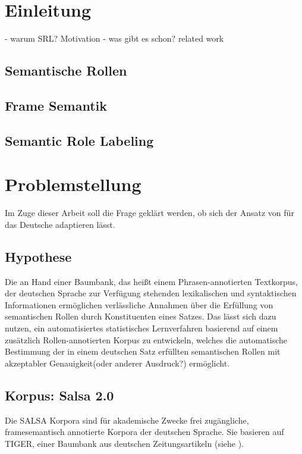 \documentclass[12pt]{article}
\begin{document}
\pagestyle{fancy} %
\fancyhf{} %
\renewcommand{\headrulewidth}{0pt} %
\renewcommand{\footrulewidth}{0pt} %
\fancyfoot[C]{\thepage} %


\newpage
{}

\section{Einleitung}
- warum SRL? Motivation
- was gibt es schon? related work
\subsection{Semantische Rollen}
\subsection{Frame Semantik}
\subsection{Semantic Role Labeling}
\section{Problemstellung}
Im Zuge dieser Arbeit soll die Frage geklärt werden, ob sich der Ansatz von \cite{gildea} für das Deutsche adaptieren lässt.
\subsection{Hypothese}
Die an Hand einer Baumbank, das heißt einem Phrasen-annotierten Textkorpus, der deutschen Sprache zur Verfügung stehenden lexikalischen und syntaktischen Informationen ermöglichen verlässliche Annahmen über die Erfüllung von semantischen Rollen durch Konstituenten eines Satzes. Das lässt sich dazu nutzen, ein automatisiertes statistisches Lernverfahren basierend auf einem zusätzlich Rollen-annotierten Korpus zu entwickeln, welches die automatische Bestimmung der in einem deutschen Satz erfüllten semantischen Rollen mit akzeptabler Genauigkeit(oder anderer Ausdruck?) ermöglicht.
\subsection{Korpus: Salsa 2.0}
Die SALSA Korpora sind für akademische Zwecke frei zugängliche, framesemantisch annotierte Korpora der deutschen Sprache. Sie basieren auf TIGER, einer Baumbank aus deutschen Zeitungsartikeln (siehe \cite{tiger}). 
\end{document}

